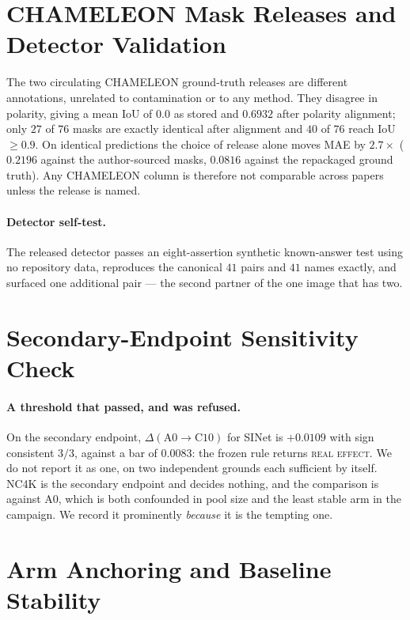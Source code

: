 \documentclass{article} %
\begin{document}
\section{CHAMELEON Mask Releases and Detector Validation}
\label{app:masks}

The two circulating CHAMELEON ground-truth releases are different annotations, unrelated to
contamination or to any method. They disagree in polarity, giving a mean IoU of $0.0$ as stored and
$0.6932$ after polarity alignment; only $27$ of $76$ masks are exactly identical after alignment and
$40$ of $76$ reach IoU $\geq 0.9$. On identical predictions the choice of release alone moves MAE by
$2.7\times$ ($0.2196$ against the author-sourced masks, $0.0816$ against the repackaged ground truth).
Any CHAMELEON column is therefore not comparable across papers unless the release is named.

\paragraph{Detector self-test.} The released detector passes an eight-assertion synthetic
known-answer test using no repository data, reproduces the canonical $41$ pairs and $41$ names
exactly, and surfaced one additional pair --- the second partner of the one image that has two.


\section{Secondary-Endpoint Sensitivity Check}

\paragraph{A threshold that passed, and was refused.} On the secondary endpoint,
$\Delta(\mathrm{A0} \rightarrow \mathrm{C10})$ for SINet is $+0.0109$ with sign consistent $3/3$,
against a bar of $0.0083$: the frozen rule returns \textsc{real effect}. We do not report it as
one, on two independent grounds each sufficient by itself. NC4K is the secondary endpoint and decides
nothing, and the comparison is against A0, which is both confounded in pool size and the least
stable arm in the campaign. We record it prominently \emph{because} it is the tempting one.


\section{Arm Anchoring and Baseline Stability}
\label{app:anchor}
\end{document}
